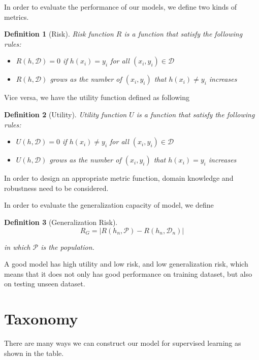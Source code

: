 \documentclass[10pt,twocolumn,letterpaper]{article}
\newtheorem{definition}{Definition}[section]
\begin{document}
In order to evaluate the performance of our models, we define two kinds of metrics.

\begin{definition}[Risk]
	Risk function $R$ is a function that satisfy the following rules:
	\begin{itemize}
		\item $R(h, \mathcal{D}) = 0$ if $h(x_i) = y_i$ for all $(x_i, y_i) \in \mathcal{D}$
		\item $R(h, \mathcal{D})$ grows as the number of $(x_i, y_i)$ that $h(x_i) \neq y_i$ increases
	\end{itemize}
\end{definition}

Vice versa, we have the utility function defined as following
\begin{definition}[Utility]
	Utility function $U$ is a function that satisfy the following rules:
	\begin{itemize}
		\item $U(h, \mathcal{D}) = 0$ if $h(x_i) \neq y_i$ for all $(x_i, y_i) \in \mathcal{D}$
		\item $U(h, \mathcal{D})$ grows as the number of $(x_i, y_i)$ that $h(x_i) = y_i$ increases
	\end{itemize}
\end{definition}

In order to design an appropriate metric function, domain knowledge and robustness need to be considered.

In order to evaluate the generalization capacity of model, we define

\begin{definition}[Generalization Risk]
	\[R_G = |R(h_n, \mathcal{P}) - R(h_n, \mathcal{D}_n)|\]
	
	in which $\mathcal{P}$ is the population.
\end{definition}

A good model has high utility and low risk, and low generalization risk\cite{goodfellow_bengio_courville_2017}, which means that it does not only has good performance on training dataset, but also on testing unseen dataset.

\section{Taxonomy}
	There are many ways we can construct our model for supervised learning as shown in the table.
	
\end{document}
